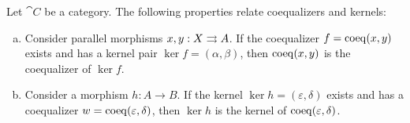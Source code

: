 \begin{proposition}
    \label{prop:coeq-and-ker}
    Let \(\cat C\) be a category. The
    following properties relate coequalizers and kernels:
    \begin{enumerate}[(a)]\setlength\itemsep{0em}
        \item Consider parallel morphisms \(x, y: X \rightrightarrows A\). If the coequalizer
              \(f = \operatorname{coeq}(x, y)\) exists and has a kernel pair \(\ker f = (\alpha, \beta)\),
              then \(\operatorname{coeq}(x, y)\) is the coequalizer of \(\ker f\).

        \item Consider a morphism \(h: A \to B\). If the kernel
              \(\ker h = (\varepsilon, \delta)\) exists and has a coequalizer
              \(w = \operatorname{coeq}(\varepsilon, \delta)\), then \(\ker h\) is the kernel of
              \(\operatorname{coeq}(\varepsilon, \delta)\).
    \end{enumerate}
\end{proposition}

